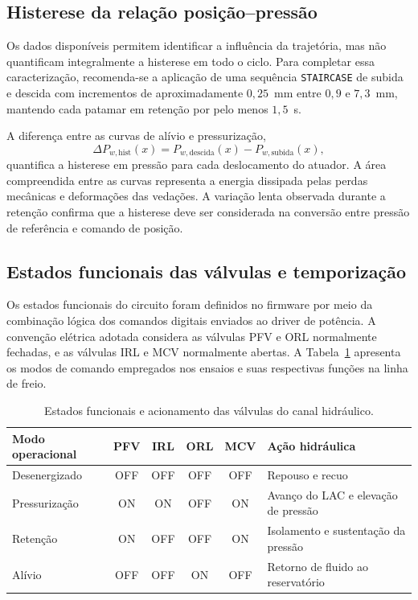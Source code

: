 \subsection{Histerese da relação posição--pressão}
\label{sec:resultado-final-histerese}
Os dados disponíveis permitem identificar a influência da trajetória, mas não quantificam integralmente a histerese em todo o ciclo. Para completar essa caracterização, recomenda-se a aplicação de uma sequência \texttt{STAIRCASE} de subida e descida com incrementos de aproximadamente $0,25$~mm entre $0,9$ e $7,3$~mm, mantendo cada patamar em retenção por pelo menos $1,5$~s.

A diferença entre as curvas de alívio e pressurização,
\begin{equation}
    \Delta P_{w,\mathrm{hist}}(x) = P_{w,\mathrm{descida}}(x) - P_{w,\mathrm{subida}}(x),
    \label{eq:delta_pressao_histerese}
\end{equation}
quantifica a histerese em pressão para cada deslocamento do atuador. A área compreendida entre as curvas representa a energia dissipada pelas perdas mecânicas e deformações das vedações. A variação lenta observada durante a retenção confirma que a histerese deve ser considerada na conversão entre pressão de referência e comando de posição.

\subsection{Estados funcionais das válvulas e temporização}
\label{sec:resultado-final-valvulas}

Os estados funcionais do circuito foram definidos no firmware por meio da combinação lógica dos comandos digitais enviados ao driver de potência. A convenção elétrica adotada considera as válvulas PFV e ORL normalmente fechadas, e as válvulas IRL e MCV normalmente abertas. A Tabela~\ref{tab:resultado-final-valvulas} apresenta os modos de comando empregados nos ensaios e suas respectivas funções na linha de freio.

\begin{table}[htbp]
    \centering
    \caption{Estados funcionais e acionamento das válvulas do canal hidráulico.}
    \label{tab:resultado-final-valvulas}
    \begin{tabular}{l c c c c l}
        \toprule
        Modo operacional & PFV & IRL & ORL & MCV & Ação hidráulica \\
        \midrule
        Desenergizado    & OFF & OFF & OFF & OFF & Repouso e recuo \\
        Pressurização    & ON  & ON  & OFF & ON  & Avanço do LAC e elevação de pressão \\
        Retenção         & ON  & OFF & OFF & ON  & Isolamento e sustentação da pressão \\
        Alívio           & OFF & OFF & ON  & OFF & Retorno de fluido ao reservatório \\
        \bottomrule
    \end{tabular}
\end{table}

